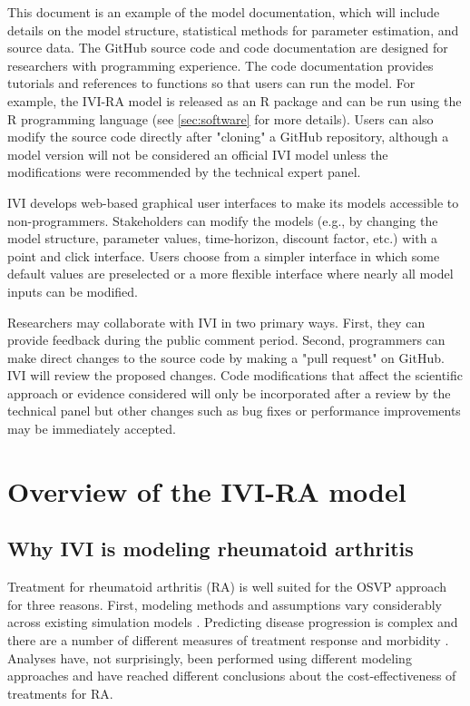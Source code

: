 \documentclass[11pt,final,fleqn]{article}\usepackage[]{graphicx}\usepackage[]{color}
\theoremstyle{plain}
\newcommand\R{{\textsf{R}}}
\begin{document}
This document is an example of the model documentation, which will include details on the model structure, statistical methods for parameter estimation, and source data. The GitHub source code and code documentation are designed for researchers with programming experience. The code documentation provides tutorials and references to functions so that users can run the model. For example, the IVI-RA model is released as an \R{} package and can be run using the \R{} programming language (see \autoref{sec:software} for more details). Users can also modify the source code directly after "cloning" a GitHub repository, although a model version will not be considered an official IVI model unless the modifications were recommended by the technical expert panel.  

IVI develops web-based graphical user interfaces to make its models accessible to non-programmers. Stakeholders can modify the models (e.g., by changing the model structure, parameter values, time-horizon, discount factor, etc.) with a point and click interface. Users choose from a simpler interface in which some default values are preselected or a more flexible interface where nearly all model inputs can be modified. 

Researchers may collaborate with IVI in two primary ways. First, they can provide feedback during the public comment period. Second, programmers can make direct changes to the source code by making a "pull request" on GitHub. IVI will review the proposed changes. Code modifications that affect the scientific approach or evidence considered will only be incorporated after a review by the technical panel but other changes such as bug fixes or performance improvements may be immediately accepted.

\section{Overview of the IVI-RA model}\label{sec:overview-ra}

\subsection{Why IVI is modeling rheumatoid arthritis}
Treatment for rheumatoid arthritis (RA) is well suited for the OSVP approach for three reasons. First, modeling methods and assumptions vary considerably across existing simulation models  \citep{brennan2003modelling, wailoo2008biologic, tosh2011sheffield, carlson2015economic, stephens2015modelling, athanasakis2015cost, stevenson2016adalimumab, icer2017tim, stevenson2017cost}. Predicting disease progression is complex and there are a number of different measures of treatment response and morbidity \citep{madan2015consensus}. Analyses have, not surprisingly, been performed using different modeling approaches and have reached different conclusions about the cost-effectiveness of treatments for RA. 
\end{document}
